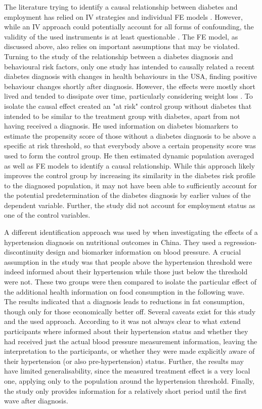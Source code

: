 The literature trying to identify a causal relationship between diabetes and employment has relied on \ac{IV} strategies \parencite{Brown2005,Latif2009,Seuring2015} and individual \ac{FE} models \parencite{Seuring2016}. However, while an \ac{IV} approach could potentially account for all forms of confounding, the validity of the used instruments is at least questionable \parencite{Seuring2016}. The \ac{FE} model, as discussed above, also relies on important assumptions that may be violated. Turning to the study of the relationship between a diabetes diagnosis and behavioural risk factors, only one study has intended to causally related a recent diabetes diagnosis with changes in health behaviours in the USA, finding positive behaviour changes shortly after diagnosis. However, the effects were mostly short lived and tended to dissipate over time, particularly considering weight loss \parencite{Slade2012}. To isolate the causal effect \textcite{Slade2012} created an "at risk" control group without diabetes that intended to be similar to the treatment group with diabetes, apart from not having received a diagnosis. He used information on diabetes biomarkers to estimate the propensity score of those without a diabetes diagnosis to be above a specific at risk threshold, so that everybody above a certain propensity score was used to form the control group. He then estimated dynamic population averaged as well as \ac{FE} models to identify a causal relationship. While this approach likely improves the control group by increasing its similarity in the diabetes risk profile to the diagnosed population, it may not have been able to sufficiently account for the potential predetermination of the diabetes diagnosis by earlier values of the dependent variable. Further, the study did not account for employment status as one of the control variables.

A different identification approach was used by \textcite{Zhao2013a} when investigating the effects of a hypertension diagnosis on nutritional outcomes in China. They used a regression-discontinuity design and biomarker information on blood pressure. A crucial assumption in the study was that people above the hypertension threshold were indeed informed about their hypertension while those just below the threshold were not. These two groups were then compared to isolate the particular effect of the additional health information on food consumption in the following wave. The results indicated that a diagnosis leads to reductions in fat consumption, though only for those economically better off. Several caveats exist for this study and the used approach. According to \textcite{Zhao2013a} it was not always clear to what extend participants where informed about their hypertension status and whether they had received just the actual blood pressure measurement information, leaving the interpretation to the participants, or whether they were made explicitly aware of their hypertension (or also pre-hypertension) status. Further, the results may have limited generalisability, since the measured treatment effect is a very local one, applying only to the population around the hypertension threshold. Finally, the study only provides information for a relatively short period until the first wave after diagnosis. 

